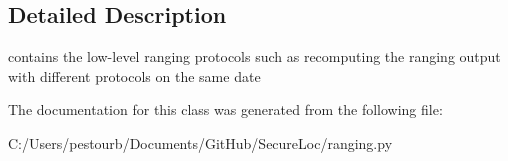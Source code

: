 \subsection{Detailed Description}
\begin{DoxyVerb}contains the low-level ranging protocols such as recomputing the ranging output 
with different protocols on the same date\end{DoxyVerb}
 

The documentation for this class was generated from the following file\+:\begin{DoxyCompactItemize}
\item 
C\+:/\+Users/pestourb/\+Documents/\+Git\+Hub/\+Secure\+Loc/ranging.\+py\end{DoxyCompactItemize}
